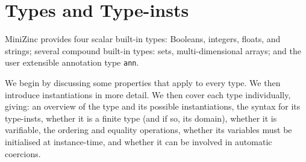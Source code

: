 \documentclass[10pt]{scrartcl}
\begin{document}
\section{Types and Type-insts}
  \label{Types}
MiniZinc provides four scalar built-in types:  Booleans, integers, floats, and
strings;  several compound built-in types:  sets, multi-dimensional arrays;
and the user extensible annotation type \texttt{ann}.

\CommonInstantiationTypeInstDescription{}


We begin by discussing some properties that apply to every type.  We then
introduce instantiations in more detail.  We then cover each type
individually, giving:  an overview of the type and its possible
instantiations, the syntax for its type-insts, whether it is a finite
type (and if so, its domain), whether it is varifiable, the ordering and
equality operations, whether its variables must be initialised at
instance-time, and whether it can be involved in automatic coercions.  

\end{document}
